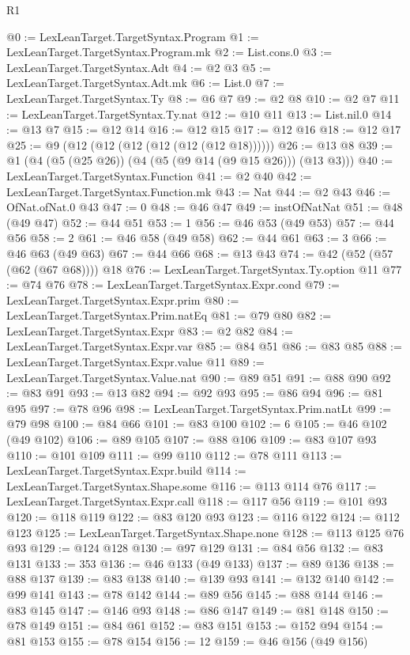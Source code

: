 \begin{lexlean}{R1}
\begin{coremodule}
@0 := LexLeanTarget.TargetSyntax.Program
@1 := LexLeanTarget.TargetSyntax.Program.mk
@2 := List.cons.{0}
@3 := LexLeanTarget.TargetSyntax.Adt
@4 := @2 @3
@5 := LexLeanTarget.TargetSyntax.Adt.mk
@6 := List.{0}
@7 := LexLeanTarget.TargetSyntax.Ty
@8 := @6 @7
@9 := @2 @8
@10 := @2 @7
@11 := LexLeanTarget.TargetSyntax.Ty.nat
@12 := @10 @11
@13 := List.nil.{0}
@14 := @13 @7
@15 := @12 @14
@16 := @12 @15
@17 := @12 @16
@18 := @12 @17
@25 := @9 (@12 (@12 (@12 (@12 (@12 (@12 @18))))))
@26 := @13 @8
@39 := @1 (@4 (@5 (@25 @26)) (@4 (@5 (@9 @14 (@9 @15 @26))) (@13 @3)))
@40 := LexLeanTarget.TargetSyntax.Function
@41 := @2 @40
@42 := LexLeanTarget.TargetSyntax.Function.mk
@43 := Nat
@44 := @2 @43
@46 := OfNat.ofNat.{0} @43
@47 := 0
@48 := @46 @47
@49 := instOfNatNat
@51 := @48 (@49 @47)
@52 := @44 @51
@53 := 1
@56 := @46 @53 (@49 @53)
@57 := @44 @56
@58 := 2
@61 := @46 @58 (@49 @58)
@62 := @44 @61
@63 := 3
@66 := @46 @63 (@49 @63)
@67 := @44 @66
@68 := @13 @43
@74 := @42 (@52 (@57 (@62 (@67 @68)))) @18
@76 := LexLeanTarget.TargetSyntax.Ty.option @11
@77 := @74 @76
@78 := LexLeanTarget.TargetSyntax.Expr.cond
@79 := LexLeanTarget.TargetSyntax.Expr.prim
@80 := LexLeanTarget.TargetSyntax.Prim.natEq
@81 := @79 @80
@82 := LexLeanTarget.TargetSyntax.Expr
@83 := @2 @82
@84 := LexLeanTarget.TargetSyntax.Expr.var
@85 := @84 @51
@86 := @83 @85
@88 := LexLeanTarget.TargetSyntax.Expr.value @11
@89 := LexLeanTarget.TargetSyntax.Value.nat
@90 := @89 @51
@91 := @88 @90
@92 := @83 @91
@93 := @13 @82
@94 := @92 @93
@95 := @86 @94
@96 := @81 @95
@97 := @78 @96
@98 := LexLeanTarget.TargetSyntax.Prim.natLt
@99 := @79 @98
@100 := @84 @66
@101 := @83 @100
@102 := 6
@105 := @46 @102 (@49 @102)
@106 := @89 @105
@107 := @88 @106
@109 := @83 @107 @93
@110 := @101 @109
@111 := @99 @110
@112 := @78 @111
@113 := LexLeanTarget.TargetSyntax.Expr.build
@114 := LexLeanTarget.TargetSyntax.Shape.some
@116 := @113 @114 @76
@117 := LexLeanTarget.TargetSyntax.Expr.call
@118 := @117 @56
@119 := @101 @93
@120 := @118 @119
@122 := @83 @120 @93
@123 := @116 @122
@124 := @112 @123
@125 := LexLeanTarget.TargetSyntax.Shape.none
@128 := @113 @125 @76 @93
@129 := @124 @128
@130 := @97 @129
@131 := @84 @56
@132 := @83 @131
@133 := 353
@136 := @46 @133 (@49 @133)
@137 := @89 @136
@138 := @88 @137
@139 := @83 @138
@140 := @139 @93
@141 := @132 @140
@142 := @99 @141
@143 := @78 @142
@144 := @89 @56
@145 := @88 @144
@146 := @83 @145
@147 := @146 @93
@148 := @86 @147
@149 := @81 @148
@150 := @78 @149
@151 := @84 @61
@152 := @83 @151
@153 := @152 @94
@154 := @81 @153
@155 := @78 @154
@156 := 12
@159 := @46 @156 (@49 @156)

\end{coremodule}
\end{lexlean}
